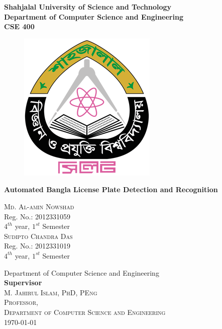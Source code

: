 {\huge \bf Shahjalal University of Science and Technology}\\
{\LARGE \bf Department of Computer Science and Engineering} \\
\vfill
{\Large \bf CSE 400} \\

\vfill
\begin{figure}[h]
\centering
\includegraphics[scale=2.5]{./img/logo}
\end{figure}


\vfill 
{\LARGE \bf Automated Bangla License Plate Detection and Recognition} \\
\begin{multicols}{2}
\textsc{\Large Md. Al-amin Nowshad}\\
Reg. No.: 2012331059\\ $4^{th}$ year, $1^{st}$ Semester\\
\textsc{\Large Sudipto Chandra Das} \\
Reg. No.: 2012331019\\ $4^{th}$ year, $1^{st}$ Semester
\end{multicols}

\vfill
Department of Computer Science and Engineering\\

\vfill
{\bf Supervisor}\\
\textsc{\Large M. Jahirul Islam, PhD, PEng\\
Professor,\\
Department of Computer Science and Engineering} \\


\vfill
\today